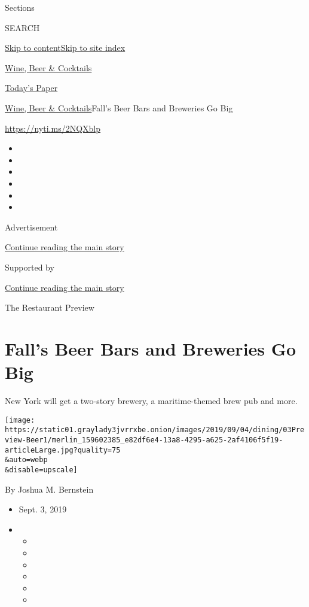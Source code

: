 Sections

SEARCH

\protect\hyperlink{site-content}{Skip to
content}\protect\hyperlink{site-index}{Skip to site index}

\href{https://www.nytimes3xbfgragh.onion/section/food/drinks}{Wine, Beer
\& Cocktails}

\href{https://myaccount.nytimes3xbfgragh.onion/auth/login?response_type=cookie\&client_id=vi}{}

\href{https://www.nytimes3xbfgragh.onion/section/todayspaper}{Today's
Paper}

\href{/section/food/drinks}{Wine, Beer \& Cocktails}\textbar{}Fall's
Beer Bars and Breweries Go Big

\url{https://nyti.ms/2NQXblp}

\begin{itemize}
\item
\item
\item
\item
\item
\item
\end{itemize}

Advertisement

\protect\hyperlink{after-top}{Continue reading the main story}

Supported by

\protect\hyperlink{after-sponsor}{Continue reading the main story}

The Restaurant Preview

\hypertarget{falls-beer-bars-and-breweries-go-big}{%
\section{Fall's Beer Bars and Breweries Go
Big}\label{falls-beer-bars-and-breweries-go-big}}

New York will get a two-story brewery, a maritime-themed brew pub and
more.

\texttt{[image: https://static01.graylady3jvrrxbe.onion/images/2019/09/04/dining/03Preview-Beer1/merlin\_159602385\_e82df6e4-13a8-4295-a625-2af4106f5f19-articleLarge.jpg?quality=75\\\&auto=webp\\\&disable=upscale]}

By Joshua M. Bernstein

\begin{itemize}
\item
  Sept. 3, 2019
\item
  \begin{itemize}
  \item
  \item
  \item
  \item
  \item
  \item
  \end{itemize}
\end{itemize}

